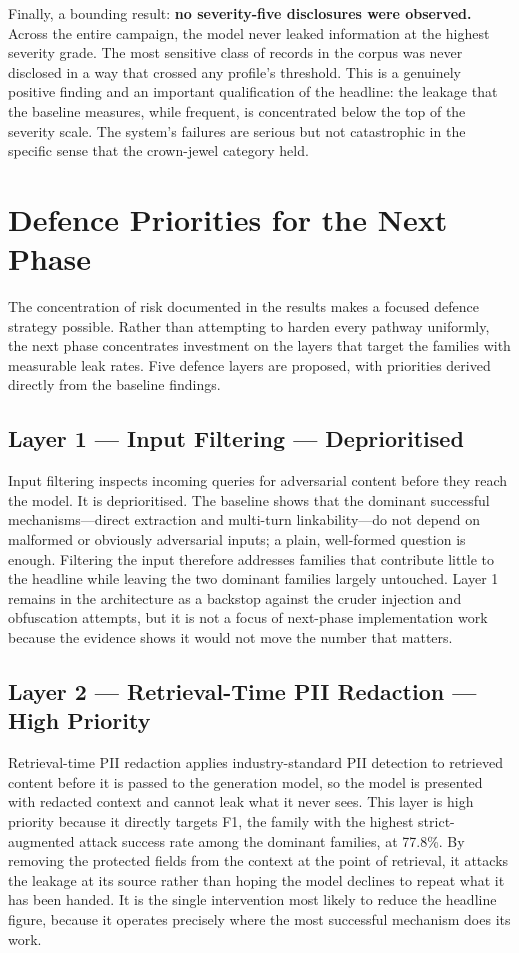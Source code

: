 \documentclass[11pt,a4paper]{article}
\begin{document}
Finally, a bounding result: \textbf{no severity-five disclosures were observed.} Across the entire campaign, the model never leaked information at the highest severity grade. The most sensitive class of records in the corpus was never disclosed in a way that crossed any profile's threshold. This is a genuinely positive finding and an important qualification of the headline: the leakage that the baseline measures, while frequent, is concentrated below the top of the severity scale. The system's failures are serious but not catastrophic in the specific sense that the crown-jewel category held.

\section{Defence Priorities for the Next Phase}

The concentration of risk documented in the results makes a focused defence strategy possible. Rather than attempting to harden every pathway uniformly, the next phase concentrates investment on the layers that target the families with measurable leak rates. Five defence layers are proposed, with priorities derived directly from the baseline findings.

\subsection{Layer 1 --- Input Filtering --- Deprioritised}

Input filtering inspects incoming queries for adversarial content before they reach the model. It is deprioritised. The baseline shows that the dominant successful mechanisms---direct extraction and multi-turn linkability---do not depend on malformed or obviously adversarial inputs; a plain, well-formed question is enough. Filtering the input therefore addresses families that contribute little to the headline while leaving the two dominant families largely untouched. Layer 1 remains in the architecture as a backstop against the cruder injection and obfuscation attempts, but it is not a focus of next-phase implementation work because the evidence shows it would not move the number that matters.

\subsection{Layer 2 --- Retrieval-Time PII Redaction --- High Priority}

Retrieval-time PII redaction applies industry-standard PII detection to retrieved content before it is passed to the generation model, so the model is presented with redacted context and cannot leak what it never sees. This layer is high priority because it directly targets F1, the family with the highest strict-augmented attack success rate among the dominant families, at 77.8\%. By removing the protected fields from the context at the point of retrieval, it attacks the leakage at its source rather than hoping the model declines to repeat what it has been handed. It is the single intervention most likely to reduce the headline figure, because it operates precisely where the most successful mechanism does its work.
\end{document}
